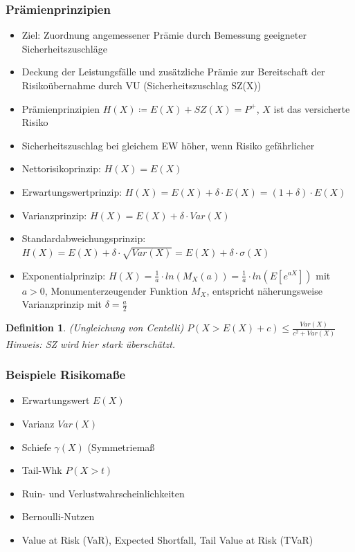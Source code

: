 \documentclass[12pt]{report}
\theoremstyle{dotless}
\newtheorem{defn}[thm]{Definition}
\theoremstyle{definition}
\begin{document}
\subsubsection{Prämienprinzipien}
\begin{itemize}
	\item Ziel: Zuordnung angemessener Prämie durch Bemessung geeigneter Sicherheitszuschläge
	\item Deckung der Leistungsfälle und zusätzliche Prämie zur Bereitschaft der Risikoübernahme durch VU (Sicherheitszuschlag SZ(X))
	\item Prämienprinzipien $H(X) \coloneqq E(X)+SZ(X)=P^+$, $X$ ist das versicherte Risiko
	\item Sicherheitszuschlag bei gleichem EW höher, wenn Risiko gefährlicher
	\item Nettorisikoprinzip: $H(X)=E(X)$
	\item Erwartungswertprinzip: $H(X)=E(X)+\delta \cdot E(X) = (1+\delta) \cdot E(X)$
	\item Varianzprinzip: $H(X)=E(X) + \delta \cdot Var(X)$
	\item Standardabweichungsprinzip: $H(X)=E(X) + \delta \cdot \sqrt{Var(X)} = E(X) + \delta \cdot \sigma(X)$
	\item Exponentialprinzip: $H(X) = \frac{1}{a} \cdot ln(M_X(a)) = \frac{1}{a}\cdot ln(E[e^{aX}])$ mit $a>0$, Monumenterzeugender Funktion $M_X$, entspricht näherungsweise Varianzprinzip mit $\delta = \frac{a}{2}$
\end{itemize}

\begin{defn}
	(Ungleichung von Centelli)
	$P(X>E(X)+c) \leq \frac{Var(X)}{c^2+Var(X)}$ \\
	Hinweis: SZ wird hier stark überschätzt.
\end{defn}

\subsubsection{Beispiele Risikoma{\ss}e}
\begin{itemize}
	\item Erwartungswert $E(X)$
	\item Varianz $Var(X)$
	\item Schiefe $\gamma(X)$ (Symmetriema{\ss}
	\item Tail-Whk $P(X>t)$
	\item Ruin- und Verlustwahrscheinlichkeiten
	\item Bernoulli-Nutzen
	\item Value at Risk (VaR), Expected Shortfall, Tail Value at Risk (TVaR)
\end{itemize}
\end{document}
